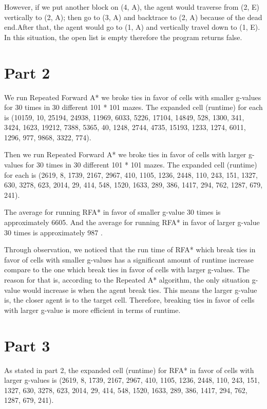 \documentclass{article}
\begin{document}
However, if we put another block on (4, A), the agent would traverse from (2, E) vertically to (2, A); then go to (3, A) and backtrace to (2, A) because of the dead end.After that, the agent would go to (1, A) and vertically travel down to (1, E). In this situation, the open list is empty therefore the program returns false.

\section*{Part 2}
\hspace{5mm}
We run Repeated Forward A* we broke ties in favor of cells with smaller g-values for 30 times in 30 different 101 * 101 mazes. The expanded cell (runtime) for each is 
(10159, 10, 25194, 24938, 11969, 6033, 5226, 17104, 14849, 528, 1300, 341, 3424, 1623, 19212, 7388, 5365, 40, 1248, 2744, 4735, 15193, 1233, 1274, 6011, 1296, 977, 9868, 3322, 774).

Then we run Repeated Forward A* we broke ties in favor of cells with larger g-values for 30 times in 30 different 101 * 101 mazes. The expanded cell (runtime) for each is 
(2619, 8, 1739, 2167, 2967, 410, 1105, 1236, 2448, 110, 243, 151, 1327, 630, 3278, 623, 2014, 29, 414, 548, 1520, 1633, 289, 386, 1417, 294, 762, 1287, 679, 241).

The average for running RFA* in favor of smaller g-value 30 times is approximately 6605. And the average for running RFA* in favor of larger g-value 30 times is approximately 987 .

Through observation, we noticed that the run time of RFA* which break ties in favor of cells with smaller g-values has a significant amount of runtime increase compare to the one which break ties in favor of cells with larger g-values. The reason for that is, according to the Repeated A* algorithm, the only situation g-value would increase is when the agent break ties. This means the larger g-value is, the closer agent is to the target cell. Therefore, breaking ties in favor of cells with larger g-value is more efficient in terms of runtime.


\section*{Part 3}
\hspace{5mm}
As stated in part 2, the expanded cell (runtime) for RFA* in favor of cells with larger g-values is
(2619, 8, 1739, 2167, 2967, 410, 1105, 1236, 2448, 110, 243, 151, 1327, 630, 3278, 623, 2014, 29, 414, 548, 1520, 1633, 289, 386, 1417, 294, 762, 1287, 679, 241).
\end{document}
